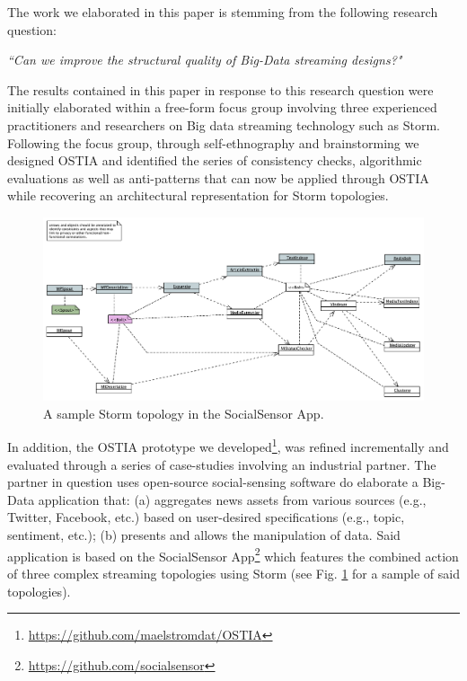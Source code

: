
The work we elaborated in this paper is stemming from the following research question:

\begin{center}
\emph{``Can we improve the structural quality of Big-Data streaming designs?"}
\end{center}

The results contained in this paper in response to this research question were initially elaborated within a free-form focus group \cite{focusgroup} involving three experienced practitioners and researchers on Big data streaming technology such as Storm. Following the focus group, through self-ethnography \cite{selfeth} and brainstorming we designed OSTIA and identified the series of consistency checks, algorithmic evaluations as well as anti-patterns that can now be applied through OSTIA while recovering an architectural representation for Storm topologies. 
\begin{figure}
\includegraphics[width=\textwidth]{images/socialsensor}
  \caption{A sample Storm topology in the SocialSensor App.}\label{topo1}
\end{figure}
In addition, the OSTIA prototype we developed\footnote{\url{https://github.com/maelstromdat/OSTIA}}, was refined incrementally and evaluated through a series of case-studies \cite{casestudy} involving an industrial partner. The partner in question uses open-source social-sensing software do elaborate a Big-Data application that: (a) aggregates news assets from various sources (e.g., Twitter, Facebook, etc.) based on user-desired specifications (e.g., topic, sentiment, etc.); (b) presents and allows the manipulation of data. Said application is based on the SocialSensor App\footnote{\url{https://github.com/socialsensor}} which features the combined action of three complex streaming topologies using Storm (see Fig. \ref{topo1} for a sample of said topologies).

